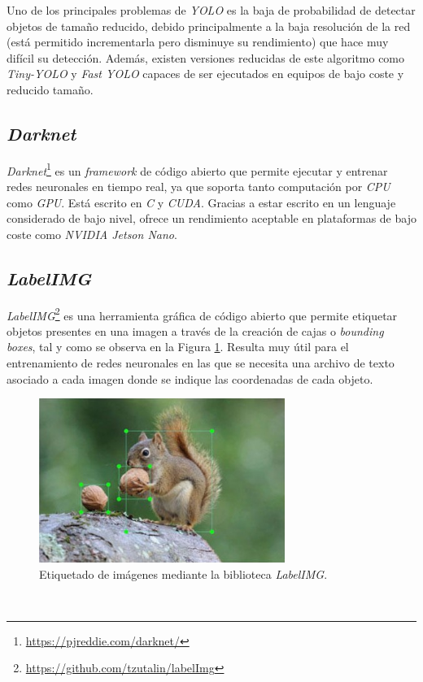 Uno de los principales problemas de \textit{YOLO} es la baja de probabilidad de detectar objetos de tamaño reducido, debido principalmente a la baja resolución de la red (está permitido incrementarla pero disminuye su rendimiento) que hace muy difícil su detección. Además, existen versiones reducidas de este algoritmo como \textit{Tiny-YOLO} y \textit{Fast YOLO} capaces de ser ejecutados en equipos de bajo coste y reducido tamaño.\\

\subsection{\textit{Darknet}}
\label{subsection:darknet}
\textit{Darknet}\footnote{\url{https://pjreddie.com/darknet/}} es un \textit{framework} de código abierto que permite ejecutar y entrenar redes neuronales en tiempo real, ya que soporta tanto computación por \textit{CPU} como \textit{GPU}. Está escrito en \textit{C} y \textit{CUDA}. Gracias a estar escrito en un lenguaje considerado de bajo nivel, ofrece un rendimiento aceptable en plataformas de bajo coste como \textit{NVIDIA Jetson Nano}.\\

\subsection{\textit{LabelIMG}}
\textit{LabelIMG}\footnote{\url{https://github.com/tzutalin/labelImg}} es una herramienta gráfica de código abierto que permite etiquetar objetos presentes en una imagen a través de la creación de cajas o \textit{bounding boxes}, tal y como se observa en la Figura \ref{fig:labelimg}. Resulta muy útil para el entrenamiento de redes neuronales en las que se necesita una archivo de texto asociado a cada imagen donde se indique las coordenadas de cada objeto.\\

\begin{figure} [h!]
	\begin{center}
		\includegraphics[width=8cm]{figs/labelimg}
	\end{center}
	\caption{Etiquetado de imágenes mediante la biblioteca \textit{LabelIMG}.}
	\label{fig:labelimg}
\end{figure}\

